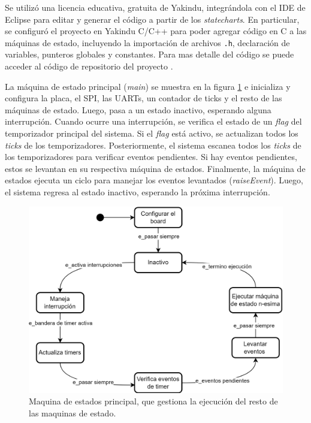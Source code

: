 Se utilizó una licencia educativa, gratuita de Yakindu, integrándola con el IDE de Eclipse para editar y generar el código a partir de los \textit{statecharts}. En particular, se configuró el proyecto en Yakindu C/C++ para poder agregar código en C a las máquinas de estado, incluyendo la importación de archivos \texttt{.h}, declaración de variables, punteros globales y constantes. Para mas detalle del código se puede acceder al código de repositorio del proyecto \cite{FirmwareSCA2024}.

La máquina de estado principal (\textit{main}) se muestra en la figura \ref{fig:sc_main} e inicializa y configura la placa, el SPI, las UARTs, un contador de ticks y el resto de las máquinas de estado. Luego, pasa a un estado inactivo, esperando alguna interrupción. Cuando ocurre una interrupción, se verifica el estado de un \textit{flag} del temporizador principal del sistema. Si el \textit{flag} está activo, se actualizan todos los \textit{ticks} de los temporizadores. Posteriormente, el sistema escanea todos los \textit{ticks} de los temporizadores para verificar eventos pendientes. Si hay eventos pendientes, estos se levantan en su respectiva máquina de estados. Finalmente, la máquina de estados ejecuta un ciclo para manejar los eventos levantados (\textit{raiseEvent}). Luego, el sistema regresa al estado inactivo, esperando la próxima interrupción.

\begin{figure}[H]
    \centering
    \includegraphics[width=0.65\linewidth]{Figuras/datalogger/Firmware/sc_main.png}
    \caption{Maquina de estados principal, que gestiona la ejecución del resto de las maquinas de estado.}
    \label{fig:sc_main}
\end{figure}



